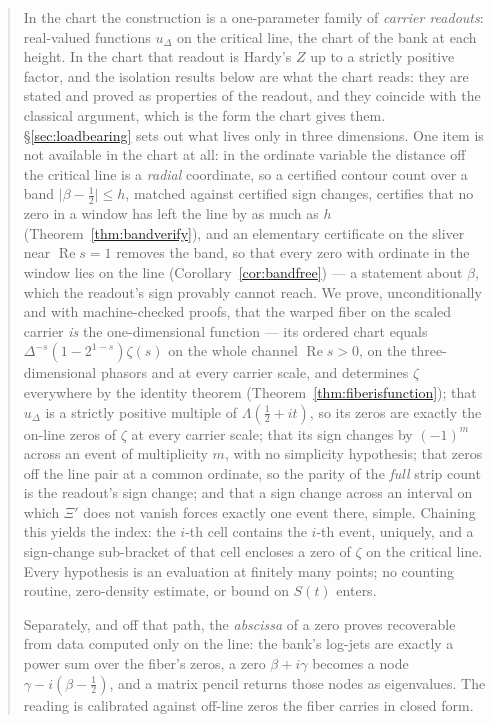 \documentclass[11pt]{article}
\theoremstyle{plain}
\theoremstyle{definition}
\theoremstyle{remark}
\begin{document}
\begin{abstract}
In the chart the construction is a one-parameter family of \emph{carrier readouts}:
real-valued functions $u_\Delta$ on the critical line, the chart of the bank at each
height. In the chart that readout is Hardy's $Z$ up to a strictly positive factor, and
the isolation results below are what the chart reads: they are stated and proved as
properties of the readout, and they coincide with the classical argument, which is the
form the chart gives them. \S\ref{sec:loadbearing} sets out what lives only in three
dimensions. One item is not available in the chart at all: in the ordinate variable the distance off the critical
line is a \emph{radial} coordinate, so a certified contour count over a band
$\lvert\beta-\tfrac12\rvert\le h$, matched against certified sign changes, certifies
that no zero in a window has left the line by as much as $h$
(Theorem~\ref{thm:bandverify}), and an elementary certificate on the sliver near
$\operatorname{Re}s=1$ removes the band, so that every zero with ordinate in the window
lies on the line (Corollary~\ref{cor:bandfree}) --- a statement about $\beta$, which the
readout's sign provably cannot reach. We prove, unconditionally and
with machine-checked proofs, that the warped fiber on the scaled carrier \emph{is} the
one-dimensional function --- its ordered chart equals $\Delta^{-s}(1-2^{1-s})\zeta(s)$ on
the whole channel $\operatorname{Re}s>0$, on the three-dimensional phasors and at every
carrier scale, and determines $\zeta$ everywhere by the identity theorem
(Theorem~\ref{thm:fiberisfunction}); that $u_\Delta$ is a strictly positive multiple of
$\Lambda(\tfrac12+it)$, so its zeros are exactly the on-line zeros of $\zeta$ at every
carrier scale; that its sign changes by $(-1)^m$ across an event of multiplicity $m$,
with no simplicity hypothesis; that zeros off the line pair at a common ordinate, so the
parity of the \emph{full} strip count is the readout's sign change; and that a sign
change across an interval on which $\Xi'$ does not vanish forces exactly one event
there, simple. Chaining this yields the index: the $i$-th cell contains the $i$-th
event, uniquely, and a sign-change sub-bracket of that cell encloses a zero of $\zeta$
on the critical line. Every hypothesis is an evaluation at finitely many points; no
counting routine, zero-density estimate, or bound on $S(t)$ enters.

Separately, and off that path, the \emph{abscissa} of a zero proves recoverable from
data computed only on the line: the bank's log-jets are exactly a power sum over the
fiber's zeros, a zero $\beta+i\gamma$ becomes a node $\gamma-i(\beta-\tfrac12)$, and a
matrix pencil returns those nodes as eigenvalues. The reading is calibrated against
off-line zeros the fiber carries in closed form.


\end{abstract}
\end{document}
